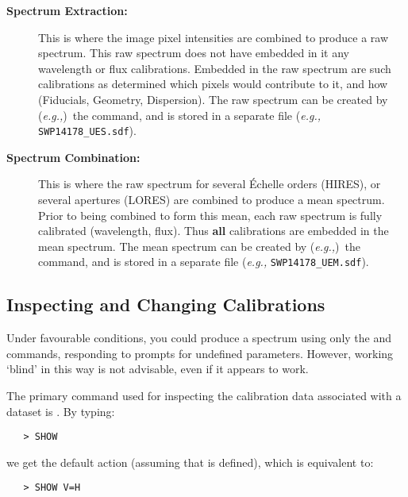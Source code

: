 \begin{description}

\item [{\bf Spectrum Extraction:}]
      This is where the image pixel intensities are
      combined to produce a raw spectrum.  This raw spectrum does not have
      embedded in it any wavelength or flux calibrations.  Embedded in
      the raw spectrum are such calibrations as determined which pixels would
      contribute to it, and how (Fiducials, Geometry, Dispersion)\@.  The raw
      spectrum can be created by ({\it{e.g.,}})\ the
       command, and
      is stored in a separate file ({\it{e.g.,}} \verb+SWP14178_UES.sdf+)\@.

\item [{\bf Spectrum Combination:}]
      This is where the raw spectrum for several
      \'{E}chelle orders (HIRES), or several apertures (LORES) are combined to
      produce a mean spectrum.  Prior to being combined to form this mean,
      each raw spectrum is fully calibrated (wavelength, flux)\@.  Thus
      {\bf all} calibrations are embedded in the mean spectrum.  The mean
      spectrum can be created by ({\it{e.g.,}})\ the 
      command, and is stored in a separate file ({\it{e.g.,}}
      \verb+SWP14178_UEM.sdf+)\@.

\end{description}


\subsection{Inspecting and Changing Calibrations}

Under favourable conditions, you could produce a spectrum using only the
 and 
 commands, responding to prompts for undefined
parameters.  However, working `blind' in this way is not advisable, even if it
appears to work.

The primary command used for inspecting the calibration data associated
with a dataset is \@. By typing:

\begin{verbatim}
   > SHOW
\end{verbatim}

we get the default action (assuming that 
is defined), which is equivalent to:

\begin{verbatim}
   > SHOW V=H
\end{verbatim}

